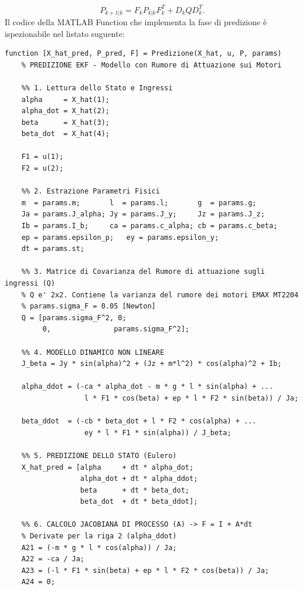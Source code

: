 \documentclass[12pt,a4paper]{article}
\begin{document}
\begin{equation}
P_{k+1|k} = F_k P_{k|k} F_k^T + D_k Q D_k^T.
\end{equation}
Il codice della MATLAB Function che implementa la fase di predizione è ispezionabile nel listato suguente:
\pagebreak
\newline
\begin{lstlisting}[style=matlabstyle, caption={Blocco di predizione dell'EKF}, label={lst:predizione_ekf}]
function [X_hat_pred, P_pred, F] = Predizione(X_hat, u, P, params)
    % PREDIZIONE EKF - Modello con Rumore di Attuazione sui Motori
    
    %% 1. Lettura dello Stato e Ingressi
    alpha     = X_hat(1);
    alpha_dot = X_hat(2);
    beta      = X_hat(3);
    beta_dot  = X_hat(4);
    
    F1 = u(1);
    F2 = u(2);
    
    %% 2. Estrazione Parametri Fisici
    m  = params.m;       l  = params.l;       g  = params.g;
    Ja = params.J_alpha; Jy = params.J_y;     Jz = params.J_z;
    Ib = params.I_b;     ca = params.c_alpha; cb = params.c_beta;
    ep = params.epsilon_p;   ey = params.epsilon_y;   
    dt = params.st;
    
    %% 3. Matrice di Covarianza del Rumore di attuazione sugli ingressi (Q)
    % Q e' 2x2. Contiene la varianza del rumore dei motori EMAX MT2204
    % params.sigma_F = 0.05 [Newton]
    Q = [params.sigma_F^2, 0;
         0,               params.sigma_F^2];

    %% 4. MODELLO DINAMICO NON LINEARE
    J_beta = Jy * sin(alpha)^2 + (Jz + m*l^2) * cos(alpha)^2 + Ib;
    
    alpha_ddot = (-ca * alpha_dot - m * g * l * sin(alpha) + ...
                   l * F1 * cos(beta) + ep * l * F2 * sin(beta)) / Ja;
                   
    beta_ddot  = (-cb * beta_dot + l * F2 * cos(alpha) + ...
                   ey * l * F1 * sin(alpha)) / J_beta;

    %% 5. PREDIZIONE DELLO STATO (Eulero)
    X_hat_pred = [alpha     + dt * alpha_dot;
                  alpha_dot + dt * alpha_ddot;
                  beta      + dt * beta_dot;
                  beta_dot  + dt * beta_ddot];

    %% 6. CALCOLO JACOBIANA DI PROCESSO (A) -> F = I + A*dt
    % Derivate per la riga 2 (alpha_ddot)
    A21 = (-m * g * l * cos(alpha)) / Ja;
    A22 = -ca / Ja;
    A23 = (-l * F1 * sin(beta) + ep * l * F2 * cos(beta)) / Ja;
    A24 = 0;
    

\end{lstlisting}
\end{document}
